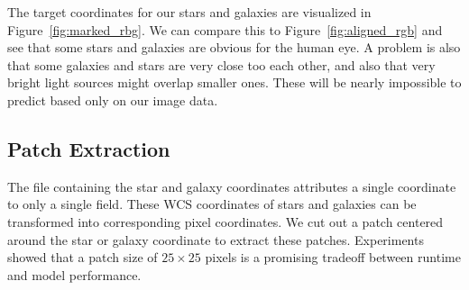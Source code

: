 \documentclass[
a4paper,     %
10pt         %
]{scrartcl}  %
\begin{document}
The target coordinates for our stars and galaxies are visualized in Figure~\ref{fig:marked_rbg}.
We can compare this to Figure~\ref{fig:aligned_rgb} and see that some stars and galaxies are obvious for the human eye.
A problem is also that some galaxies and stars are very close too each other, and also that very bright light sources might overlap smaller ones.
These will be nearly impossible to predict based only on our image data.

\subsection{Patch Extraction}
The file containing the star and galaxy coordinates attributes a single coordinate to only a single field.
These WCS coordinates of stars and galaxies can be transformed into corresponding pixel coordinates.
We cut out a patch centered around the star or galaxy coordinate to extract these patches.
Experiments showed that a patch size of $25\times 25$ pixels is a promising tradeoff between runtime and model performance.
\end{document}
